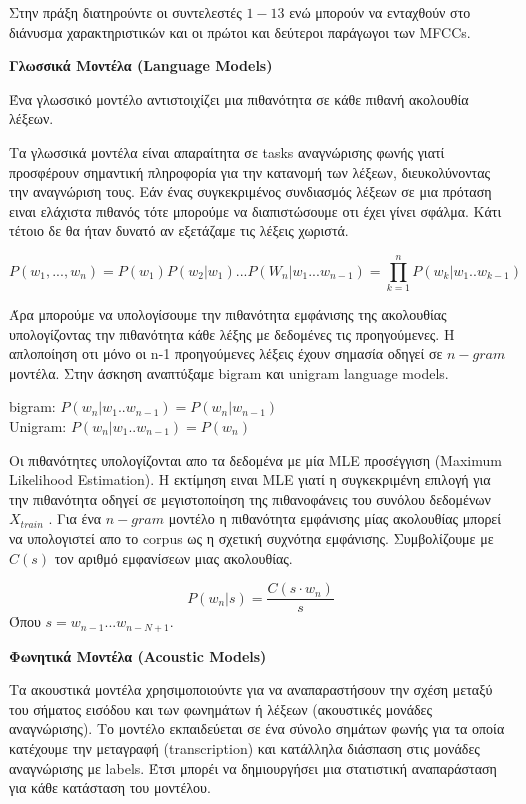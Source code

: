 \documentclass[12pt]{article}
\begin{document}
Στην πράξη διατηρούντε οι συντελεστές $1-13$ ενώ μπορούν να ενταχθούν στο διάνυσμα χαρακτηριστικών και οι πρώτοι και δεύτεροι παράγωγοι των MFCCs.


\bigbreak
\bigbreak
\textbf{Γλωσσικά Μοντέλα (Language Models)}

Ένα γλωσσικό μοντέλο αντιστοιχίζει μια πιθανότητα σε κάθε πιθανή ακολουθία λέξεων. 

Τα γλωσσικά μοντέλα είναι απαραίτητα σε tasks αναγνώρισης φωνής γιατί προσφέρουν σημαντική πληροφορία για την κατανομή των λέξεων, διευκολύνοντας την αναγνώριση τους. Εάν ένας συγκεκριμένος συνδιασμός λέξεων σε μια πρόταση ειναι ελάχιστα πιθανός τότε μπορούμε να διαπιστώσουμε οτι έχει γίνει σφάλμα. Κάτι τέτοιο δε θα ήταν δυνατό αν εξετάζαμε τις λέξεις χωριστά. 

$$P(w_1,...,w_n) = P(w_1)P(w_2|w_1)...P(W_n|w_1...w_{n-1}) = \prod_{k=1}^nP(w_k|w_1..w_{k-1})$$

Άρα μπορούμε να υπολογίσουμε την πιθανότητα εμφάνισης της ακολουθίας υπολογίζοντας την πιθανότητα κάθε λέξης με δεδομένες τις προηγούμενες. Η απλοποίηση οτι μόνο οι n-1 προηγούμενες λέξεις έχουν σημασία οδηγεί σε $n-gram$ μοντέλα. Στην άσκηση αναπτύξαμε bigram και unigram language models.

bigram: $P(w_n|w_1..w_{n-1}) = P(w_n|w_{n-1})$\\
Unigram: $P(w_n|w_1..w_{n-1}) = P(w_n)$

Οι πιθανότητες υπολογίζονται απο τα δεδομένα με μία MLE προσέγγιση (Maximum Likelihood Estimation). Η εκτίμηση ειναι MLE γιατί η συγκεκριμένη επιλογή για την πιθανότητα οδηγεί σε μεγιστοποίηση της πιθανοφάνεις του συνόλου δεδομένων $X_{train}$ .  Για ένα $n-gram$ μοντέλο η πιθανότητα εμφάνισης μίας ακολουθίας μπορεί να υπολογιστεί απο το corpus ως η σχετική συχνότηα εμφάνισης. Συμβολίζουμε με $C(s)$ τον αριθμό εμφανίσεων μιας ακολουθίας. 

$$ P(w_n|s) = \frac{C(s\cdot w_n)}{s}$$
Όπου $s = w_{n-1}...w_{n-N+1}$. 

\bigbreak
\bigbreak
\textbf{Φωνητικά Μοντέλα (Acoustic Models)}

Τα ακουστικά μοντέλα χρησιμοποιούντε για να αναπαραστήσουν την σχέση μεταξύ του σήματος εισόδου και των φωνημάτων ή λέξεων (ακουστικές μονάδες αναγνώρισης). Το μοντέλο  εκπαιδεύεται σε ένα σύνολο σημάτων φωνής για τα οποία κατέχουμε την μεταγραφή (transcription) και κατάλληλα διάσπαση στις μονάδες αναγνώρισης με labels. Έτσι μπορέι να δημιουργήσει μια στατιστική αναπαράσταση για κάθε κατάσταση του μοντέλου.
\end{document}
